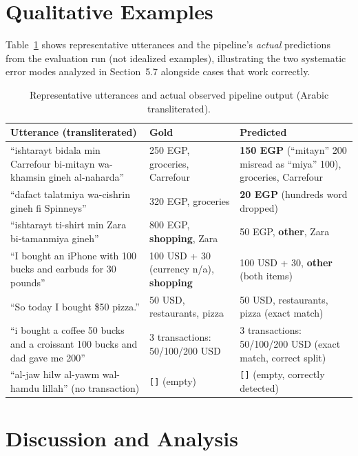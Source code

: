 \section{Qualitative Examples}

Table~\ref{tab:qualitative} shows representative utterances and the pipeline's
\emph{actual} predictions from the evaluation run (not idealized examples),
illustrating the two systematic error modes analyzed in Section~5.7 alongside
cases that work correctly.

\begin{table}[H]
\centering
\caption{Representative utterances and actual observed pipeline output (Arabic transliterated).}
\label{tab:qualitative}
\small
\renewcommand{\arraystretch}{1.3}
\begin{tabularx}{\textwidth}{X X X}
\toprule
\textbf{Utterance (transliterated)} & \textbf{Gold} & \textbf{Predicted} \\
\midrule
``ishtarayt bidala min Carrefour bi-mitayn wa-khamsin gineh al-naharda'' & 250 EGP, groceries, Carrefour & \textbf{150 EGP} (``mitayn'' 200 misread as ``miya'' 100), groceries, Carrefour \\
``da\!fact talatmiya wa-cishrin gineh fi Spinneys'' & 320 EGP, groceries & \textbf{20 EGP} (hundreds word dropped) \\
``ishtarayt ti-shirt min Zara bi-tamanmiya gineh'' & 800 EGP, \textbf{shopping}, Zara & 50 EGP, \textbf{other}, Zara \\
``I bought an iPhone with 100 bucks and earbuds for 30 pounds'' & 100 USD + 30 (currency n/a), \textbf{shopping} & 100 USD + 30, \textbf{other} (both items) \\
``So today I bought \$50 pizza.'' & 50 USD, restaurants, pizza & 50 USD, restaurants, pizza (exact match) \\
``i bought a coffee 50 bucks and a croissant 100 bucks and dad gave me 200'' & 3 transactions: 50/100/200 USD & 3 transactions: 50/100/200 USD (exact match, correct split) \\
``al-jaw hilw al-yawm wal-hamdu lillah'' (no transaction) & \texttt{[]} (empty) & \texttt{[]} (empty, correctly detected) \\
\bottomrule
\end{tabularx}
\end{table}

\section{Discussion and Analysis}

